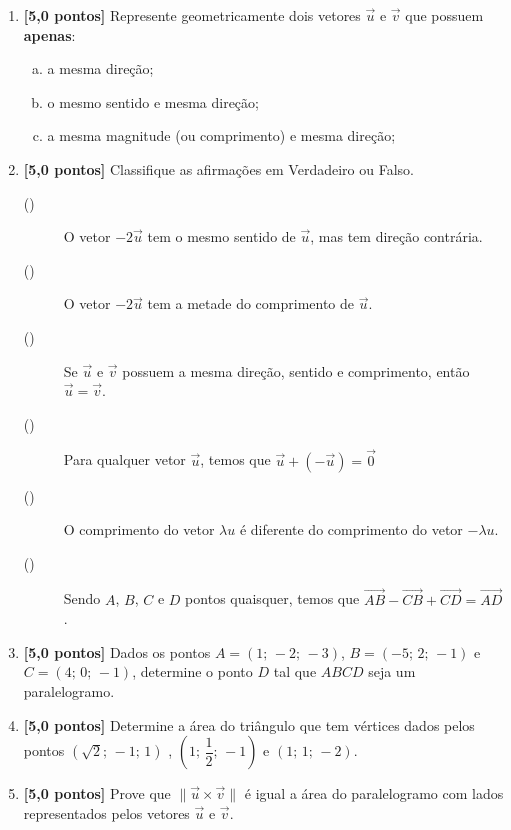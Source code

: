 \documentclass[12pt,a4paper]{article}
\begin{document}
\begin{enumerate}

  \item \textbf{[5,0 pontos]} Represente geometricamente dois vetores $\vec{u}$ e $\vec{v}$ que possuem
  \textbf{apenas}:
  
    \begin{enumerate}[(a)]
      \item a mesma direção;
      \item o mesmo sentido e mesma direção;
      \item a mesma magnitude (ou comprimento) e mesma direção;
    \end{enumerate}
  
  \item \textbf{[5,0 pontos]} Classifique as afirmações em Verdadeiro ou Falso.
  
  \begin{description}
    \item[(\quad)] O vetor $-2\vec{u}$ tem o mesmo sentido de $\vec{u}$, mas tem 
      direção contrária.
    \item[(\quad)] O vetor $-2\vec{u}$ tem a metade do comprimento de $\vec{u}$.
    \item[(\quad)] Se $\vec{u}$ e $\vec{v}$ possuem a mesma direção, sentido e
      comprimento, então $\vec{u} = \vec{v}$.
    \item[(\quad)] Para qualquer vetor $\vec{u}$, temos que
      $\vec{u} + (-\vec{u}) = \vec{0}$
    \item[(\quad)] O comprimento do vetor $\lambda u$ é diferente do comprimento 
      do vetor $-\lambda u$.
    \item[(\quad)] Sendo $A$, $B$, $C$ e $D$ pontos quaisquer, temos que 
      $\overrightarrow{AB} - \overrightarrow{CB} + \overrightarrow{CD} = \overrightarrow{AD}$.
  \end{description}
  
  \item \textbf{[5,0 pontos]} Dados os pontos $A = (1;\, -2;\, -3)$, $B = (-5;\, 2;\, -1)$ e $C = (4;\, 0;\, -1)$, 
  determine o ponto $D$ tal que $ABCD$ seja um paralelogramo.
   
  \item \textbf{[5,0 pontos]} Determine a área do triângulo que tem vértices dados 
  pelos pontos $\left(\sqrt{2};\, -1;\, 1\right)$ , $\left(1;\, \dfrac{1}{2};\, -1\right)$ e 
  $\left(1;\, 1;\, -2\right)$.
    
  \item \textbf{[5,0 pontos]} Prove que $\|\vec{u}\times\vec{v}\|$ é igual
  a área do paralelogramo com lados representados pelos vetores $\vec{u}$ e $\vec{v}$.
  
\end{enumerate}
\end{document}

